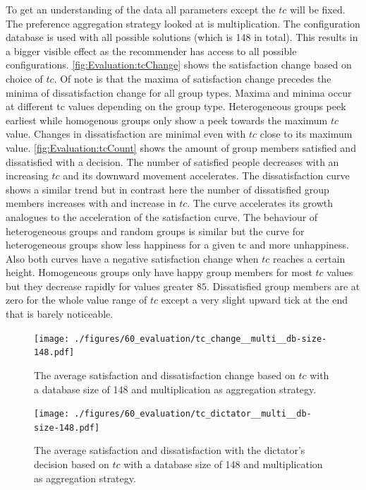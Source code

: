 To get an understanding of the data all parameters except the $tc$ will be fixed. The preference aggregation strategy looked at is multiplication. The configuration database is used with all possible solutions (which is 148 in total). This results in a bigger visible effect as the recommender has access to all possible configurations. \autoref{fig:Evaluation:tcChange} shows the satisfaction change based on choice of $tc$. Of note is that the maxima of satisfaction change precedes the minima of dissatisfaction change for all group types. Maxima and minima occur at different tc values depending on the group type. Heterogeneous groups peek earliest while homogenous groups only show a peek towards the maximum $tc$ value. Changes in dissatisfaction are minimal even with $tc$ close to its maximum value. \autoref{fig:Evaluation:tcCount} shows the amount of group members satisfied and dissatisfied with a decision. The number of satisfied people decreases with an increasing $tc$ and its downward movement accelerates. The dissatisfaction curve shows a similar trend but in contrast here the number of dissatisfied group members increases with and increase in $tc$. The curve accelerates its growth analogues to the acceleration of the satisfaction curve. The behaviour of heterogeneous groups and random groups is similar but the curve for heterogeneous groups show less happiness for a given tc and more unhappiness. Also both curves have a negative satisfaction change when $tc$ reaches a certain height. Homogeneous groups only have happy group members for most $tc$ values but they decrease rapidly for values greater $85$. Dissatisfied group members are at zero for the whole value range of $tc$ except a very slight upward tick at the end that is barely noticeable.

\begin{figure}
    \centering
    \texttt{[image: ./figures/60\_evaluation/tc\_change\_\_multi\_\_db-size-148.pdf]}
    \caption{The average satisfaction and dissatisfaction change based on $tc$ with a database size of 148 and multiplication as aggregation strategy.}
    \label{fig:Evaluation:tcChange}
\end{figure}

\begin{figure}
    \centering
    \texttt{[image: ./figures/60\_evaluation/tc\_dictator\_\_multi\_\_db-size-148.pdf]}
    \caption{The average satisfaction and dissatisfaction with the dictator's decision based on $tc$ with a database size of 148 and multiplication as aggregation strategy.}
    \label{fig:Evaluation:tcCount}
\end{figure}

